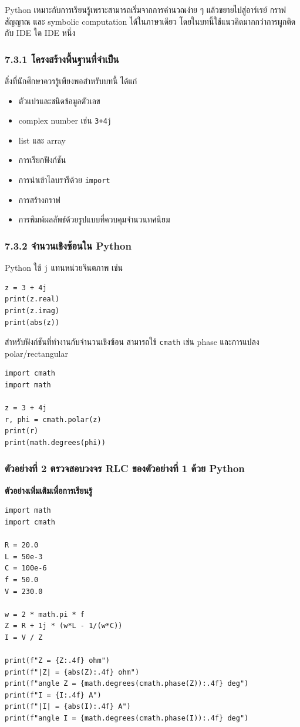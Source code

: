 Python เหมาะกับการเรียนรู้เพราะสามารถเริ่มจากการคำนวณง่าย ๆ แล้วขยายไปสู่อาร์เรย์ กราฟ สัญญาณ และ symbolic computation ได้ในภาษาเดียว โดยในบทนี้ใช้แนวคิดมากกว่าการผูกติดกับ IDE ใด IDE หนึ่ง

\subsubsection{7.3.1 โครงสร้างพื้นฐานที่จำเป็น}

สิ่งที่นักศึกษาควรรู้เพียงพอสำหรับบทนี้ ได้แก่

\begin{itemize}
    \item ตัวแปรและชนิดข้อมูลตัวเลข
    \item complex number เช่น \texttt{3+4j}
    \item list และ array
    \item การเรียกฟังก์ชัน
    \item การนำเข้าไลบรารีด้วย \texttt{import}
    \item การสร้างกราฟ
    \item การพิมพ์ผลลัพธ์ด้วยรูปแบบที่ควบคุมจำนวนทศนิยม
\end{itemize}

\subsubsection{7.3.2 จำนวนเชิงซ้อนใน Python}

Python ใช้ \texttt{j} แทนหน่วยจินตภาพ เช่น

\begin{verbatim}
z = 3 + 4j
print(z.real)
print(z.imag)
print(abs(z))
\end{verbatim}

สำหรับฟังก์ชันที่ทำงานกับจำนวนเชิงซ้อน สามารถใช้ \texttt{cmath} เช่น phase และการแปลง polar/rectangular

\begin{verbatim}
import cmath
import math

z = 3 + 4j
r, phi = cmath.polar(z)
print(r)
print(math.degrees(phi))
\end{verbatim}

\subsubsection{ตัวอย่างที่ 2 ตรวจสอบวงจร RLC ของตัวอย่างที่ 1 ด้วย Python}

\textbf{ตัวอย่างเพิ่มเติมเพื่อการเรียนรู้}

\begin{verbatim}
import math
import cmath

R = 20.0
L = 50e-3
C = 100e-6
f = 50.0
V = 230.0

w = 2 * math.pi * f
Z = R + 1j * (w*L - 1/(w*C))
I = V / Z

print(f"Z = {Z:.4f} ohm")
print(f"|Z| = {abs(Z):.4f} ohm")
print(f"angle Z = {math.degrees(cmath.phase(Z)):.4f} deg")
print(f"I = {I:.4f} A")
print(f"|I| = {abs(I):.4f} A")
print(f"angle I = {math.degrees(cmath.phase(I)):.4f} deg")
\end{verbatim}

